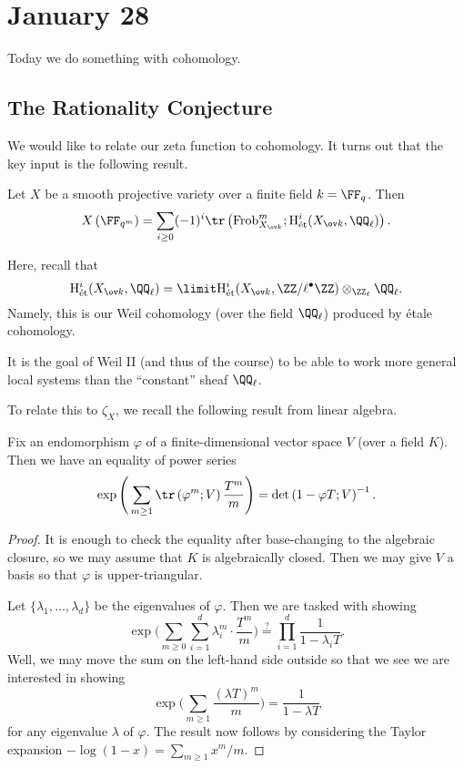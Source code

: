 \documentclass[../notes.tex]{subfiles}
\begin{document}
\section{January 28}

Today we do something with cohomology.

\subsection{The Rationality Conjecture}
We would like to relate our zeta function to cohomology. It turns out that the key input is the following result.
\begin{theorem} \label{thm:g-l-trace}
	Let $X$ be a smooth projective variety over a finite field $k=\FF_q$. Then
	\[X\left(\FF_{q^m}\right)=\sum_{i\ge0}(-1)^i\tr\left(\mathrm{Frob}_{X_{\ov k}}^m;\mathrm H^i_{\mathrm{\acute et}}(X_{\ov k},\QQ_\ell)\right).\]
\end{theorem}
Here, recall that
\[\mathrm H^i_{\mathrm{\acute et}}(X_{\ov k},\QQ_\ell)=\limit\mathrm H^i_{\mathrm{\acute et}}(X_{\ov k},\ZZ/\ell^\bullet\ZZ)\otimes_{\ZZ_\ell}\QQ_\ell.\]
Namely, this is our Weil cohomology (over the field $\QQ_\ell$) produced by \'etale cohomology.
\begin{remark}
	It is the goal of Weil II (and thus of the course) to be able to work more general local systems than the ``constant'' sheaf $\QQ_\ell$.
\end{remark}
To relate this to $\zeta_X$, we recall the following result from linear algebra.
\begin{lemma} \label{lem:exp-tr-is-det}
	Fix an endomorphism $\varphi$ of a finite-dimensional vector space $V$ (over a field $K$). Then we have an equality of power series
	\[\exp\Bigg(\sum_{m\ge1}\tr\left(\varphi^m;V\right)\frac{T^m}m\Bigg)=\det\left(1-\varphi T;V\right)^{-1}.\]
\end{lemma}
\begin{proof}
	It is enough to check the equality after base-changing to the algebraic closure, so we may assume that $K$ is algebraically closed. Then we may give $V$ a basis so that $\varphi$ is upper-triangular.

	Let $\{\lambda_1,\ldots,\lambda_d\}$ be the eigenvalues of $\varphi$. Then we are tasked with showing
	\[\exp\Bigg(\sum_{m\ge0}\sum_{i=1}^d\lambda_i^m\cdot\frac{T^m}m\Bigg)\stackrel?=\prod_{i=1}^d\frac1{1-\lambda_iT}.\]
	Well, we may move the sum on the left-hand side outside so that we see we are interested in showing
	\[\exp\Bigg(\sum_{m\ge1}\frac{(\lambda T)^m}m\Bigg)=\frac1{1-\lambda T}\]
	for any eigenvalue $\lambda$ of $\varphi$. The result now follows by considering the Taylor expansion $-\log(1-x)=\sum_{m\ge1}x^m/m$.
\end{proof}
\end{document}
